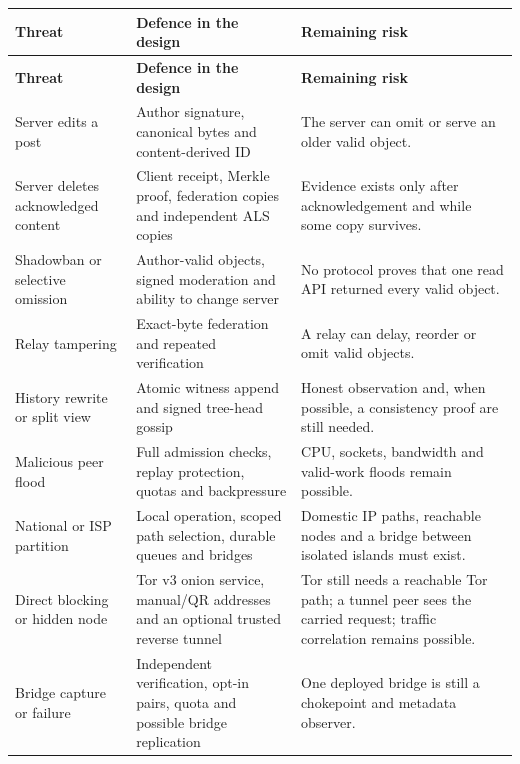 \documentclass[12pt,a4paper]{article}
\begin{document}
\begin{small}
\begin{longtable}{@{}>{\raggedright\arraybackslash}p{}>{\raggedright\arraybackslash}p{}>{\raggedright\arraybackslash}p{}@{}}
\toprule
\textbf{Threat} & \textbf{Defence in the design} & \textbf{Remaining risk} \\
\midrule
\endfirsthead
\toprule
\textbf{Threat} & \textbf{Defence in the design} & \textbf{Remaining risk} \\
\midrule
\endhead
\bottomrule
\endfoot
Server edits a post & Author signature, canonical bytes and content-derived ID & The server can omit or serve an older valid object. \\
\addlinespace[2pt]
Server deletes acknowledged content & Client receipt, Merkle proof, federation copies and independent ALS copies & Evidence exists only after acknowledgement and while some copy survives. \\
\addlinespace[2pt]
Shadowban or selective omission & Author-valid objects, signed moderation and ability to change server & No protocol proves that one read API returned every valid object. \\
\addlinespace[2pt]
Relay tampering & Exact-byte federation and repeated verification & A relay can delay, reorder or omit valid objects. \\
\addlinespace[2pt]
History rewrite or split view & Atomic witness append and signed tree-head gossip & Honest observation and, when possible, a consistency proof are still needed. \\
\addlinespace[2pt]
Malicious peer flood & Full admission checks, replay protection, quotas and backpressure & CPU, sockets, bandwidth and valid-work floods remain possible. \\
\addlinespace[2pt]
National or ISP partition & Local operation, scoped path selection, durable queues and bridges & Domestic IP paths, reachable nodes and a bridge between isolated islands must exist. \\
\addlinespace[2pt]
Direct blocking or hidden node & Tor v3 onion service, manual/QR addresses and an optional trusted reverse tunnel & Tor still needs a reachable Tor path; a tunnel peer sees the carried request; traffic correlation remains possible. \\
\addlinespace[2pt]
Bridge capture or failure & Independent verification, opt-in pairs, quota and possible bridge replication & One deployed bridge is still a chokepoint and metadata observer. \\

\end{longtable}
\end{small}
\end{document}
